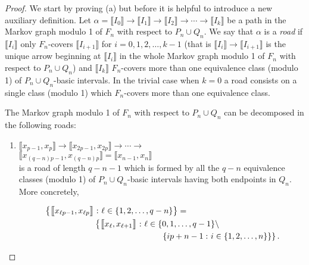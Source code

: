 \documentclass[a4paper, 11pt]{amsart}
\numberwithin{equation}{section}
\theoremstyle{customnumberedtheorem}
\theoremstyle{definitionwithbfnote}
\newcommand{\set}[2]{\ensuremath{\left\{#1 \,\colon #2\right\}}}
\newcommand{\bigBIclass}[1]{\ensuremath{\bigl\llbracket #1\bigr\rrbracket}}
\begin{document}
\begin{proof}
We start by proving (a) but before it is helpful to introduce
a new auxiliary definition.
Let
$
\alpha = \bigBIclass{I_0}\longrightarrow \bigBIclass{I_1}
                        \longrightarrow \bigBIclass{I_2}
                        \longrightarrow \cdots
                        \longrightarrow \bigBIclass{I_k}
$
be a path in the Markov graph modulo 1 of $F_n$ with respect to
$P_n \cup Q_n.$
We say that $\alpha$ is a \emph{road\/}
if $\bigBIclass{I_i}$ only $F_n$-covers $\bigBIclass{I_{i+1}}$
for $i=0,1,2,\dots,k-1$
(that is $\bigBIclass{I_i}\longrightarrow\bigBIclass{I_{i+1}}$ is the
unique arrow beginning at $\bigBIclass{I_i}$ in the whole Markov graph
modulo 1 of $F_n$ with respect to $P_n \cup Q_n$) and
$\bigBIclass{I_k}$ $F_n$-covers more than one equivalence class
(modulo 1) of $P_n \cup Q_n$-basic intervals.
In the trivial case when $k=0$ a road consists on a single
class (modulo 1) which $F_n$-covers more than one equivalence class.

The Markov graph modulo 1 of $F_n$ with respect to $P_n \cup Q_n$
can be decomposed in the following roads:
\begin{enumerate}
\item $
  \bigBIclass{x_{p-1},x_{p}} \longrightarrow
  \bigBIclass{x_{2p-1},x_{2p}} \longrightarrow\cdots \longrightarrow$\\
  \hspace*{\fill}$\bigBIclass{x_{(q-n)p-1},x_{(q-n)p}} = \bigBIclass{x_{n-1},x_{n}}
$\\[\smallskipamount]
is a road of length $q-n-1$ which is formed by all the
$q-n$ equivalence classes (modulo 1) of
$P_n \cup Q_n$-basic intervals having both endpoints in $Q_n.$
More concretely,\addtocounter{equation}{-1}
\begin{equation}\label{road1-Classes}
\begin{split}
 & \set{\bigBIclass{x_{\ell p-1},x_{\ell p}}}{\ell \in \{1,2,\dots,q-n\}} = \\
 & \hspace*{6em}\left\{\bigBIclass{x_\ell,x_{\ell+1}}\,\colon \ell \in \{0,1,\dots,q-1\}\setminus \right. \\
 & \hspace*{14em}\left.\set{i p + n-1}{i\in\{1,2,\dots,n\}}\right\}.
\end{split}
\end{equation}


\end{enumerate}
\end{proof}
\end{document}
